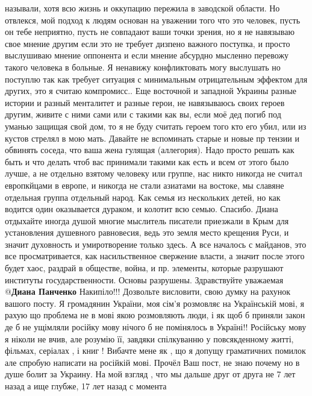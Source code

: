 \begin{itemize}
называли, хотя всю жизнь и оккупацию пережила в заводской области. 
Но отвлекся, мой подход к людям основан на уважении того что это человек, пусть
он тебе неприятно, пусть не совпадают ваши точки зрения, но я не навязываю свое
мнение другим если это не требует дизпено важного поступка, и просто выслушиваю
мнение оппонента и если мнение абсурдно мысленно перевожу такого человека в
больные. 
Я ненавижу конфликтовать могу выслушать но поступлю так как требует ситуация с
минимальным отрицательным эффектом для других, это я считаю компромисс.. 
Еще восточной и западной Украины разные истории и разный менталитет и разные
герои, не навязываюсь своих героев другим, живите с ними сами или с такими как
вы, если моё дед погиб под уманью защищая свой дом, то я не буду считать героем
того кто его убил, или из кустов стрелял в мою мать. 
Давайте не вспоминать старые и новые пр тензии и обвинять соседа, что ваша жена
гулящая (аллегория). 
Надо просто решать как быть и что делать чтоб вас принимали такими как есть и
всем от этого было лучше, а не отдельно взятому человеку или группе, нас никто
никогда не считал европкйцами в европе, и никогда не стали азиатами на востоке,
мы славяне отдельная группа отдельный народ. Как семья из нескольких детей, но
как водится один оказывается дураком, и колотит всю семью. Спасибо.
Диана отдыхайте иногда душой многие мыслитель писатели приезжали в Крым для
установления душевного равновесия, ведь это земля место крещения Руси, и значит
духовность и умиротворение только здесь.
А все началось с майданов, это все просматривается, как насильственное
свержение власти, а значит после этого будет хаос, раздрай в обществе, война, и
пр. элементы, которые разрушают институты государственности. Основы разрушены.
Здравствуйте уважаемая @\textbf{Диана Панченко} Накипіло!!! 
Дозвольте висловити, свою думку на рахунок вашого посту. Я громадянин України,
моя сім'я розмовляє на Українській мові, я рахую що проблема не в мові якою
розмовляють люди, і як щоб б приняли закон де б не ущімляли російку мову нічого
б не помінялось в Україні!! Російську мову я ніколи не вчив, але розумію її,
завдяки спілкуванню у повсякденному житті, фільмах, серіалах , і книг ! 
Вибачте мене як , що я допущу граматичних помилок але спробую написати на
російкій мові. 
Прочёл Ваш пост, не знаю почему но в душе болит за Украину. На мой взгляд , что
мы дальше друг от друга не 7 лет назад а ище глубже, 17 лет назад с момента

\end{itemize}
